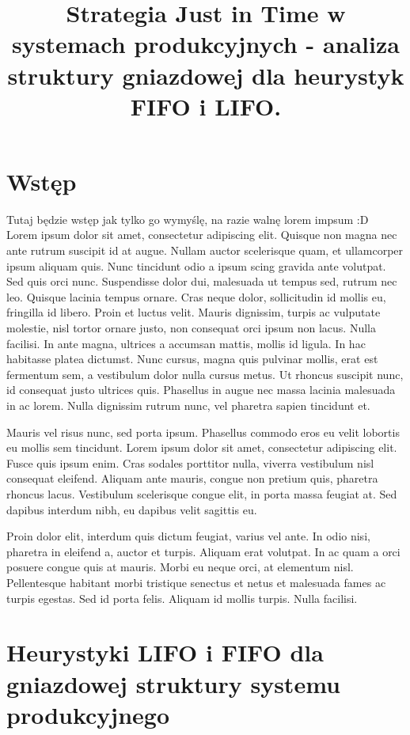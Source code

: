 \documentclass[twoside]{pracaInzynierskaMS}
\title{Strategia Just in Time w systemach produkcyjnych - analiza struktury gniazdowej dla heurystyk\\ FIFO i LIFO.}
\begin{document}
\section{Wstęp}

Tutaj będzie wstęp jak tylko go wymyślę, na razie walnę lorem impsum :D \\

Lorem ipsum dolor sit amet, consectetur adipiscing elit. Quisque non magna nec ante rutrum suscipit id at augue. Nullam auctor scelerisque quam, et ullamcorper ipsum aliquam quis. Nunc tincidunt odio a ipsum scing gravida ante volutpat. Sed quis orci nunc. Suspendisse dolor dui, malesuada ut tempus sed, rutrum nec leo. Quisque lacinia tempus ornare. Cras neque dolor, sollicitudin id mollis eu, fringilla id libero. Proin et luctus velit. Mauris dignissim, turpis ac vulputate molestie, nisl tortor ornare justo, non consequat orci ipsum non lacus. Nulla facilisi. In ante magna, ultrices a accumsan mattis, mollis id ligula. In hac habitasse platea dictumst. Nunc cursus, magna quis pulvinar mollis, erat est fermentum sem, a vestibulum dolor nulla cursus metus. Ut rhoncus suscipit nunc, id consequat justo ultrices quis. Phasellus in augue nec massa lacinia malesuada in ac lorem. Nulla dignissim rutrum nunc, vel pharetra sapien tincidunt et. 

Mauris vel risus nunc, sed porta ipsum. Phasellus commodo eros eu velit lobortis eu mollis sem tincidunt. Lorem ipsum dolor sit amet, consectetur adipiscing elit. Fusce quis ipsum enim. Cras sodales porttitor nulla, viverra vestibulum nisl consequat eleifend. Aliquam ante mauris, congue non pretium quis, pharetra rhoncus lacus. Vestibulum scelerisque congue elit, in porta massa feugiat at. Sed dapibus interdum nibh, eu dapibus velit sagittis eu. 

Proin dolor elit, interdum quis dictum feugiat, varius vel ante. In odio nisi, pharetra in eleifend a, auctor et turpis. Aliquam erat volutpat. In ac quam a orci posuere congue quis at mauris. Morbi eu neque orci, at elementum nisl. Pellentesque habitant morbi tristique senectus et netus et malesuada fames ac turpis egestas. Sed id porta felis. Aliquam id mollis turpis. Nulla facilisi.

\section    [Heurystyki LIFO i FIFO \ldots]
            {Heurystyki LIFO i FIFO \newlineSpis dla gniazdowej \newlineTekst struktury systemu produkcyjnego}
\end{document}
